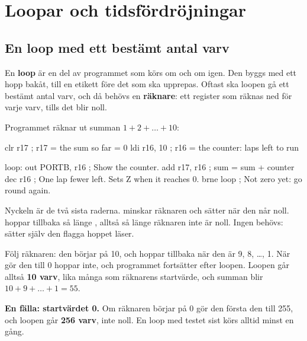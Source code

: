 
\section{Loopar och tidsfördröjningar}
\label{c9:app:b}

\subsection{En loop med ett bestämt antal varv}
\label{c9:b1}
En \textbf{loop} är en del av programmet som körs om och om igen. Den byggs med ett hopp bakåt,
till en etikett före det som ska upprepas. Oftast ska loopen gå ett bestämt antal varv, och då
behövs en \textbf{räknare}: ett register som räknas ned för varje varv, tills det blir noll.

Programmet  räknar ut summan $1 + 2 + \dots + 10$:


\begin{asmcode}
    clr r17                         ; r17 = the sum so far = 0
    ldi r16, 10                     ; r16 = the counter: laps left to run

loop:
    out PORTB, r16                  ; Show the counter.
    add r17, r16                    ; sum = sum + counter
    dec r16                         ; One lap fewer left. Sets Z when it reaches 0.
    brne loop                       ; Not zero yet: go round again.
\end{asmcode}

\noindent Nyckeln är de två sista raderna.  minskar räknaren och sätter 
när den når noll.  hoppar tillbaka så länge , alltså så länge räknaren
inte är noll. Ingen  behövs:  sätter själv den flagga hoppet läser.

Följ räknaren: den börjar på 10, och  hoppar tillbaka när den är 9, 8, \dots, 1. När
 gör den till 0 hoppar  inte, och programmet fortsätter efter loopen. Loopen
går alltså \textbf{10 varv}, lika många som räknarens startvärde, och summan blir
$10 + 9 + \dots + 1 = 55$.

\textbf{En fälla: startvärdet 0.} Om räknaren börjar på 0 gör den första  den till 255,
och loopen går \textbf{256 varv}, inte noll. En loop med testet sist körs alltid minst en gång.

